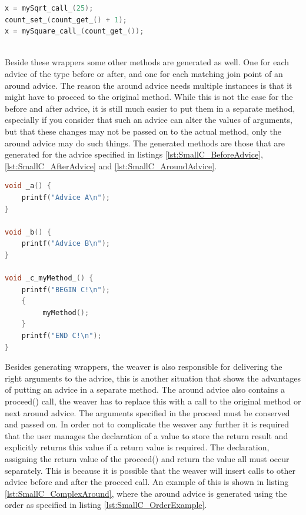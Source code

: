 \documentclass[a4paper]{report}
\begin{document}
\begin{minipage}{0.45\textwidth}
\begin{lstlisting}[language=C, caption=Example of code after weaving, label=lst:SmallC_WrapperUsageAfter]
x = mySqrt_call_(25);
count_set_(count_get_() + 1);
x = mySquare_call_(count_get_());
\end{lstlisting}
\end{minipage}\\
Beside these wrappers some other methods are generated as well. One for each advice of the type before or after, and one for each matching join point of an around advice. The reason the around advice needs multiple instances is that it might have to proceed to the original method. While this is not the case for the before and after advice, it is still much easier to put them in a separate method, especially if you consider that such an advice can alter the values of arguments, but that these changes may not be passed on to the actual method, only the around advice may do such things. The generated methods are those that are generated for the advice specified in listings \ref{lst:SmallC_BeforeAdvice}, \ref{lst:SmallC_AfterAdvice} and \ref{lst:SmallC_AroundAdvice}.\\
\begin{lstlisting}[language=C, caption=Generated methods, label=lst:SmallC_GeneratedMethods]
void _a() {
	printf("Advice A\n");
}

void _b() {
	printf("Advice B\n");
}

void _c_myMethod_() {
	printf("BEGIN C!\n");
	{
		 myMethod();
	}
	printf("END C!\n");
}
\end{lstlisting}
Besides generating wrappers, the weaver is also responsible for delivering the right arguments to the advice, this is another situation that shows the advantages of putting an advice in a separate method. The around advice also contains a proceed() call, the weaver has to replace this with a call to the original method or next around advice. The arguments specified in the proceed must be conserved and passed on. In order not to complicate the weaver any further it is required that the user manages the declaration of a value to store the return result and explicitly returns this value if a return value is required. The declaration, assigning the return value of the proceed() and return the value all must occur separately. This is because it is possible that the weaver will insert calls to other advice before and after the proceed call. An example of this is shown in listing \ref{lst:SmallC_ComplexAround}, where the around advice is generated using the order as specified in listing \ref{lst:SmallC_OrderExample}.\\
\end{document}
